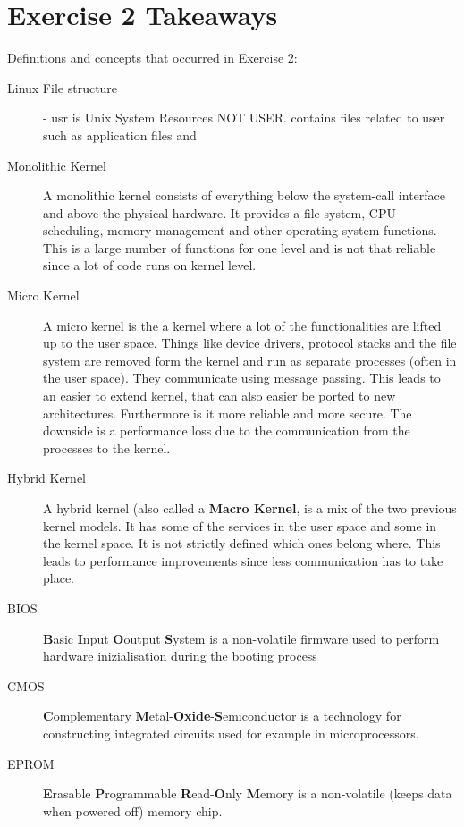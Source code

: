\documentclass{article}
\begin{document}
	\section*{Exercise 2 Takeaways}
	Definitions and concepts that occurred in Exercise 2:
	\begin{description}
		\item[Linux File structure] - usr is Unix System Resources NOT USER. contains files related to user such as application files and 
		\item[Monolithic Kernel] A monolithic kernel consists of everything below the system-call interface and above the physical hardware. It provides a file system, CPU scheduling, memory management and other operating system functions. This is a large number of functions for one level and is not that reliable since a lot of code runs on kernel level. 
		\item[Micro Kernel] A micro kernel is the a kernel where a lot of the functionalities are lifted up to the user space. Things like device drivers, protocol stacks and the file system are removed form the kernel and run as separate processes (often in the user space). They communicate using message passing. This leads to an easier to extend kernel, that can also easier be ported to new architectures. Furthermore is it more reliable and more secure. The downside is a performance loss due to the communication from the processes to the kernel. 		
		\item[Hybrid Kernel] A hybrid kernel (also called a \textbf{Macro Kernel}, is a mix of the two previous kernel models. It has some of the services in the user space and some in the kernel space. It is not strictly defined which ones belong where. This leads to performance improvements since less communication has to take place. 
		\item[BIOS] \textbf{B}asic \textbf{I}nput \textbf{O}output \textbf{S}ystem is a non-volatile firmware used to perform hardware inizialisation during the booting process
		\item[CMOS] \textbf{C}omplementary \textbf{M}etal-\textbf{Oxide}-\textbf{S}emiconductor is a technology for constructing integrated circuits used for example in microprocessors. 
		\item[EPROM] \textbf{E}rasable \textbf{P}rogrammable \textbf{R}ead-\textbf{O}nly \textbf{M}emory is a non-volatile (keeps data when powered off) memory chip. 
	\end{description}			 
	
\end{document}
